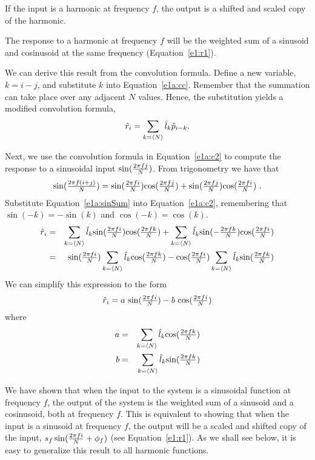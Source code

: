 \be

\item
If the input is a harmonic at frequency $f$, the output is a shifted
and scaled copy of the harmonic.

\item
The response to a harmonic at frequency $f$ will be the weighted sum
of a sinusoid and cosinusoid at the same frequency
(Equation~\ref{e1:r1}).

\ee

We can derive this result from the convolution formula.  Define a new
variable, $k=i-j$, and substitute $k$ into Equation~\ref{e1a:cc}.
Remember that the summation can take place over any adjacent $N$
values.  Hence, the substitution yields a modified convolution
formula,
\begin{equation}
\label{e1a:c2}
\mbox {$\hat{r}_{i}$} = \sum_{k = \langle N \rangle} \mbox {$\hat{l}_{k}$} \mbox{$\hat{p}_{ {i - k} }$} .
\end{equation}

Next, we use the convolution formula in Equation~\ref{e1a:c2} to
compute the response to a sinusoidal input $\mbox{$\sin ( \frac{2 \pi f j}{ N } )$}$.  From trigonometry
we have that
\begin{equation} 
\label{e1a:sinSum}
\mbox{$\sin ( \frac{2 \pi f (i + j)}{ N } )$} = \mbox{$\sin ( \frac {2 \pi f i}{ N } )$} \mbox{$\cos ( \frac{2 \pi f j}{ N })$} + \mbox{$\sin ( \frac{2 \pi f j}{ N } )$} \mbox{$\cos ( \frac{2 \pi f i}{ N } )$} ~ .
\end{equation}
Substitute Equation~\ref{e1a:sinSum} into Equation~\ref{e1a:c2},
remembering that $\sin (-k) = - \sin (k)$ and $\cos (-k) = \cos (k)$.
\begin{eqnarray}
\mbox {$\hat{r}_{i}$} & = & \sum_{k = \langle N \rangle} \mbox {$\hat{l}_{k}$} \mbox{$\sin ( \frac {2 \pi f i}{ N } )$} \mbox{$\cos ( \frac{2 \pi f k}{ N })$}
 + \sum_{k = \langle N \rangle} \mbox {$\hat{l}_{k}$} \mbox{$\sin ( - \frac{2 \pi f k}{ N })$} \mbox{$\cos ( \frac{2 \pi f i}{ N } )$} \nonumber \\
& = & \mbox{$\sin ( \frac {2 \pi f i}{ N } )$} \sum_{k = \langle N \rangle} \mbox {$\hat{l}_{k}$} \mbox{$\cos ( \frac{2 \pi f k}{ N })$}
 - \mbox{$\cos ( \frac{2 \pi f i}{ N } )$} \sum_{k = \langle N \rangle} \mbox {$\hat{l}_{k}$} \mbox{$\sin ( \frac{2 \pi f k}{ N })$}
\end{eqnarray}
We can simplify this expression to the form
\begin{equation}
\label{e1a:harmonic}
\mbox {$\hat{r}_{i}$} = a~\mbox{$\sin ( \frac {2 \pi f i}{ N } )$} - b~\mbox{$\cos ( \frac{2 \pi f i}{ N } )$}
\end{equation}
where 
\begin{eqnarray}
a & = & \sum_{k = \langle N \rangle} \mbox {$\hat{l}_{k}$} \mbox{$\cos ( \frac{2 \pi f k}{ N })$} \nonumber \\
b & = & \sum_{k = \langle N \rangle} \mbox {$\hat{l}_{k}$} \mbox{$\sin ( \frac{2 \pi f k}{ N })$} \nonumber
\end{eqnarray}

We have shown that when the input to the system is a sinusoidal
function at frequency $f$, the output of the system is the weighted
sum of a sinusoid and a cosinusoid, both at frequency $f$.  This is
equivalent to showing that when the input is a sinusoid at frequency
$f$, the output will be a scaled and shifted copy of the input, $s_f
\sin (\mbox{$\frac {2 \pi f i}{ N }$} + \phi_f )$ (see Equation~\ref{e1:r1}).  As we shall see
below, it is easy to generalize this result to all harmonic functions.

